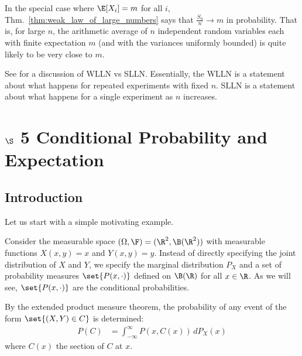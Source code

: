 \documentclass{article} %
\begin{document}
\begin{remark}
In the special case where $\E[X_i]=m$ for all $i$, Thm.~\ref{thm:weak_law_of_large_numbers} says that $\frac{S_n}{n} \to m$ in probability.  That is, for large $n$, the arithmetic average of $n$ independent random variables each with finite expectation $m$ (and with the variances uniformly bounded) is quite likely to be very close to $m$.
\end{remark}

\begin{remark} See \cite[pp.199]{ash2000probability} for a discussion of WLLN vs SLLN.  Essentially, the WLLN is a statement about what happens for repeated experiments with fixed $n$. SLLN is a statement about what happens for a single experiment as $n$ increases. 
\end{remark}

\section{$\S$ 5 Conditional Probability and Expectation}

\subsection{Introduction} \label{sec:intro_to_conditional_probability}

Let us start with a simple motivating example.

Consider the measurable space $(\Omega,\F) = (\R^2, \B(\R^2))$ with measurable functions $X(x,y)=x$ and $Y(x,y)=y$.  Instead of directly specifying the joint distribution of $X$ and $Y$, we specify the marginal distribution $P_X$ and a set of probability measures $\set{P(x, \cdot)}$ defined on $\B(\R)$ for all $x \in \R$. As we will see, $\set{P(x, \cdot)}$ are the conditional probabilities. 

By the extended product measure theorem, the probability of any event of the form $\set{(X,Y) \in C}$ is determined:
%
\begin{align}
P(C) &= \int_{-\infty}^\infty P(x, C(x)) \, dP_X(x)
\label{eqn:probability_of_joint_event}	
\end{align}
%
where $C(x)$ the section of $C$ at $x$. 
\end{document}
